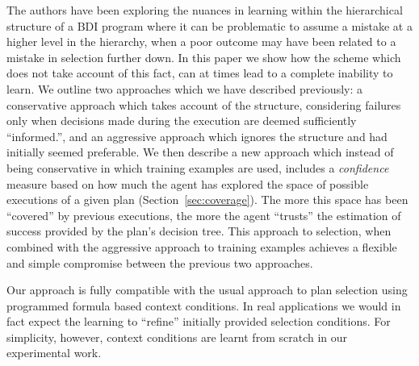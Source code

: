 The authors have been exploring the nuances in learning within the
hierarchical structure of a BDI program \cite{Airiau:IJAT09} where
it can be problematic to assume a mistake at a
higher level in the hierarchy, when a poor outcome may have been
related to a mistake in selection further down.  In this paper we show
how the scheme which does not take account of this fact, can at times
lead to a complete inability to learn.
We outline two approaches which we have described previously: a conservative approach which takes account
of the structure, considering failures only when decisions made during the execution
are deemed sufficiently ``informed.'',  and an aggressive approach which
ignores the structure and had initially seemed preferable. 
We then describe a new approach which instead of being conservative in
which training examples are used, includes a \emph{confidence}
measure based on how much the agent has explored the space of possible
executions of a given plan (Section~\ref{sec:coverage}). The more this space has
been ``covered'' by previous executions, the more the agent ``trusts'' the
estimation of success provided by the plan's decision tree. This
approach to selection, when combined with the aggressive approach to
training examples achieves a flexible and simple
compromise between the previous two approaches.

Our approach is fully compatible with the usual approach to plan
selection using programmed formula based context conditions. In real
applications we would in fact expect the learning to ``refine''
initially provided selection conditions. 
For simplicity, however, context conditions are learnt from scratch in our
experimental work.

